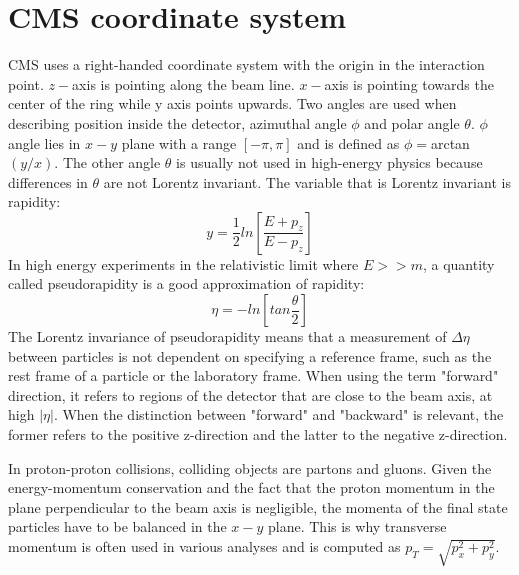 
\section{CMS coordinate system}

CMS uses a right-handed coordinate system with the origin in the interaction point. $z-$axis is pointing along the beam line. $x-$axis is pointing towards the center of the ring while y axis points upwards. Two angles are used when describing position inside the detector, azimuthal angle $\phi$ and polar angle $\theta$. $\phi$ angle lies in $x-y$ plane with a range $[-\pi,\pi]$  and is defined as $\phi=$arctan$(y/x)$. The other angle $\theta$ is usually not used in high-energy physics because differences in $\theta$ are not Lorentz invariant.
The variable that is Lorentz invariant is rapidity:
\begin{equation}
y=\frac{1}{2}ln\left[ \frac{E+p_z}{E-p_z}\right]
\end{equation}
In high energy experiments in the relativistic limit where $E>>m$, a quantity called pseudorapidity is a good approximation of rapidity:
\begin{equation}
\eta = -ln \left[ tan \frac{\theta}{2} \right]
\end{equation}
The Lorentz invariance of pseudorapidity means that a measurement of $\Delta\eta$ between particles is not dependent on specifying a reference frame, such as the rest frame of a particle or the laboratory frame. When using the term "forward" direction, it refers to regions of the detector that are close to the beam axis, at high $|\eta|$. When the distinction between "forward" and "backward" is relevant, the former refers to the positive z-direction and the latter to the negative z-direction.
\par In proton-proton collisions, colliding objects are partons and gluons. Given the energy-momentum conservation and the fact that the proton momentum in the plane perpendicular to the beam axis is negligible, the momenta of the final state particles have to be balanced in the $x-y$ plane. This is why transverse momentum is often used in various analyses and is computed as $p_T=\sqrt{p_x^2+p_y^2}$.



